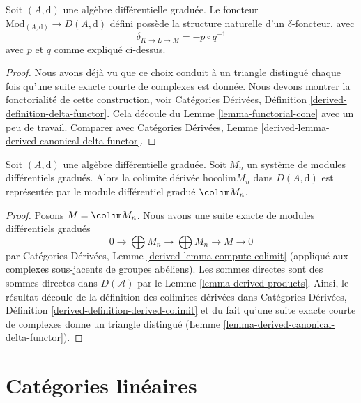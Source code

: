 \begin{lemma}
\label{lemma-derived-canonical-delta-functor}
Soit $(A, \text{d})$ une algèbre différentielle graduée. Le foncteur
$\text{Mod}_{(A, \text{d})} \to D(A, \text{d})$ défini possède la structure
naturelle d'un $\delta$-foncteur, avec
$$
\delta_{K \to L \to M} = - p \circ q^{-1}
$$
avec $p$ et $q$ comme expliqué ci-dessus.
\end{lemma}

\begin{proof}
Nous avons déjà vu que ce choix conduit à un triangle distingué chaque fois qu'une
suite exacte courte de complexes est donnée. Nous devons montrer la fonctorialité
de cette construction, voir Catégories Dérivées, Définition
\ref{derived-definition-delta-functor}. Cela découle du Lemme
\ref{lemma-functorial-cone} avec un peu de travail. Comparer avec Catégories
Dérivées, Lemme \ref{derived-lemma-derived-canonical-delta-functor}.
\end{proof}

\begin{lemma}
\label{lemma-homotopy-colimit}
Soit $(A, \text{d})$ une algèbre différentielle graduée. Soit $M_n$ un système de
modules différentiels gradués. Alors la colimite dérivée $\text{hocolim} M_n$ dans
$D(A, \text{d})$ est représentée par le module différentiel gradué $\colim M_n$.
\end{lemma}

\begin{proof}
Posons $M = \colim M_n$. Nous avons une suite exacte de modules différentiels
gradués
$$
0 \to \bigoplus M_n \to \bigoplus M_n \to M \to 0
$$
par Catégories Dérivées, Lemme \ref{derived-lemma-compute-colimit} (appliqué aux
complexes sous-jacents de groupes abéliens). Les sommes directes sont des sommes
directes dans $D(\mathcal{A})$ par le Lemme \ref{lemma-derived-products}. Ainsi,
le résultat découle de la définition des colimites dérivées dans Catégories
Dérivées, Définition \ref{derived-definition-derived-colimit} et du fait qu'une
suite exacte courte de complexes donne un triangle distingué (Lemme
\ref{lemma-derived-canonical-delta-functor}).
\end{proof}








\section{Catégories linéaires}
\label{section-linear}

